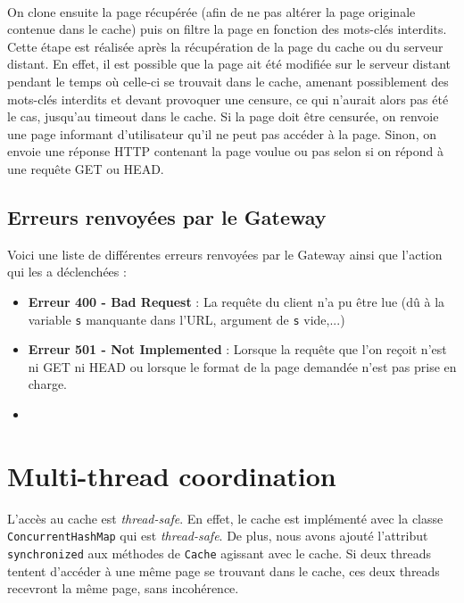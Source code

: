 \documentclass[a4paper,11pt]{article}
\begin{document}
\paragraph{}

On clone ensuite la page récupérée (afin de ne pas altérer la page originale contenue dans le cache) puis on filtre la page en fonction des mots-clés interdits. Cette étape est réalisée après la récupération de la page du cache ou du serveur distant. En effet, il est possible que la page ait été modifiée sur le serveur distant pendant le temps où celle-ci se trouvait dans le cache, amenant possiblement des mots-clés interdits et devant provoquer une censure, ce qui n'aurait alors pas été le cas, jusqu'au timeout dans le cache. Si la page doit être censurée, on renvoie une page informant d'utilisateur qu'il ne peut pas accéder à la page. Sinon, on envoie une réponse HTTP contenant la page voulue ou pas selon si on répond à une requête GET ou HEAD.



	\subsection{Erreurs renvoyées par le Gateway}
Voici une liste de différentes erreurs renvoyées par le Gateway ainsi que l'action qui les a déclenchées : 
\begin{itemize}
	\setlength{\itemsep}{5pt}
	\item \textbf{Erreur 400 - Bad Request} : La requête du client n'a pu être lue (dû à la variable \texttt{s} manquante dans l'URL, argument de \texttt{s} vide,...)
	\item \textbf{Erreur 501 - Not Implemented} : Lorsque la requête que l'on reçoit n'est ni GET ni HEAD ou lorsque le format de la page demandée n'est pas prise en charge.
	\item 

\end{itemize}

\section{Multi-thread coordination}
L'accès au cache est \textit{thread-safe}. En effet, le cache est implémenté avec la classe \texttt{ConcurrentHashMap} qui est \textit{thread-safe}. De plus, nous avons ajouté l'attribut \texttt{synchronized} aux méthodes de \texttt{Cache} agissant avec le cache. Si deux threads tentent d'accéder à une même page se trouvant dans le cache, ces deux threads recevront la même page, sans incohérence.
\end{document}
